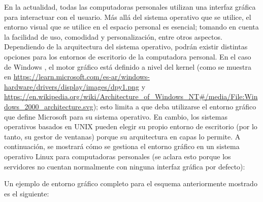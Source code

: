 \normalsize{ \indent
En la actualidad, todas las computadoras personales utilizan
una interfaz gráfica para interactuar con el usuario. Más
allá del sistema operativo que se utilice, el entorno visual
que se utilice en el espacio personal es esencial; tomando en
cuenta la facilidad de uso, comodidad y personalización, entre
otros aspectos.
}
\newline
\normalsize{ \indent
Dependiendo de la arquitectura del sistema operativo, podrán
existir distintas opciones para los entornos de escritorio de
la computadora personal. En el caso de Windows \cite{dwm_exe},
el motor gráfico está definido a nivel del kernel (como se
muestra en
\url{https://learn.microsoft.com/es-ar/windows-hardware/drivers/display/images/dpy1.png} y
\url{https://en.wikipedia.org/wiki/Architecture_of_Windows_NT#/media/File:Windows_2000_architecture.svg});
esto limita a que deba utilizarse el entorno gráfico que define
Microsoft para su sistema operativo. En cambio, los sistemas
operativos basados en UNIX \cite{x_wayland} pueden elegir su
propio entorno de escritorio (por lo tanto, su gestor de
ventanas) porque su arquitectura en capas lo permite.
}
\newline
\normalsize{ \indent
A continuación, se mostrará cómo se gestiona el entorno gráfico
en un sistema operativo Linux para computadoras personales (se
aclara esto porque los servidores no cuentan normalmente con
ninguna interfaz gráfica por defecto):
}
\newline
{}
\newline
\normalsize{ \indent
Un ejemplo de entorno gráfico completo para el esquema
anteriormente mostrado es el siguiente:
}
